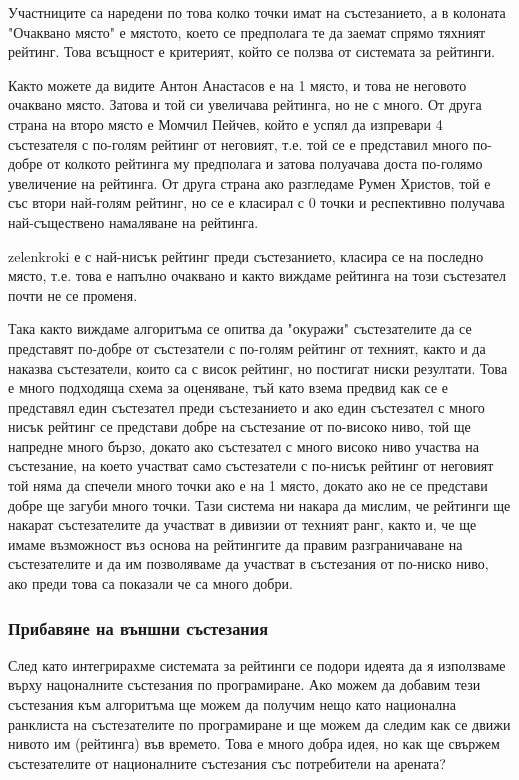 \documentclass[a4paper,12pt]{article}
\begin{document}
  Участниците са наредени по това колко точки имат на състезанието, а в колоната "Очаквано място" е мястото, което се предполага те да заемат спрямо тяхният рейтинг. Това всъщност е критерият, който се ползва от системата за рейтинги.
  
  Както можете да видите Антон Анастасов е на 1 място, и това не неговото очаквано място. Затова и той си увеличава рейтинга, но не с много. От друга страна на второ място е Момчил Пейчев, който е успял да изпревари 4 състезателя с по-голям рейтинг от неговият, т.е. той се е представил много по-добре от колкото рейтинга му предполага и затова полуачава доста по-голямо увеличение на рейтинга. От друга страна ако разгледаме Румен Христов, той е със втори най-голям рейтинг, но се е класирал с 0 точки и респективно получава най-съществено намаляване на рейтинга.
  
  zelenkroki е с най-нисък рейтинг преди състезанието, класира се на последно място, т.е. това е напълно очаквано и както виждаме рейтинга на този състезател почти не се променя.
  
  Така както виждаме алгоритъма се опитва да "окуражи" състезателите да се представят по-добре от състезатели с по-голям рейтинг от техният, както и да наказва състезатели, които са с висок рейтинг, но постигат ниски резултати. Това е много подходяща схема за оценяване, тъй като взема предвид как се е представял един състезател преди състезанието и ако един състезател с много нисък рейтинг се представи добре на състезание от по-високо ниво, той ще напредне много бързо, докато ако състезател с много високо ниво участва на състезание, на което участват само състезатели с по-нисък рейтинг от неговият той няма да спечели много точки ако е на 1 място, докато ако не се представи добре ще загуби много точки. Тази система ни накара да мислим, че рейтинги ще накарат състезателите да участват в дивизии от техният ранг, както и, че ще имаме възможност въз основа на рейтингите да правим разграничаване на състезателите и да им позволяваме да участват в състезания от по-ниско ниво, ако преди това са показали че са много добри.
  
  \subsubsection{Прибавяне на външни състезания}
    След като интегрирахме системата за рейтинги се подори идеята да я използваме върху нацоналните състезания по програмиране. Ако можем да добавим тези състезания към алгоритъма ще можем да получим нещо като национална ранклиста на състезателите по програмиране и ще можем да следим как се движи нивото им (рейтинга) във времето. Това е много добра идея, но как ще свържем състезателите от националните състезания със потребители на арената?
    
\end{document}
